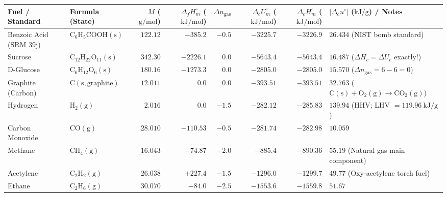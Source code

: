 \begin{center}
\label{tab:04:combustions}
\scriptsize\setlength{\tabcolsep}{3.2pt}\renewcommand{\arraystretch}{1.09}
\begin{tabularx}{\linewidth}{@{}l l r r r r r X@{}}\toprule
\textbf{Fuel / Standard} & \textbf{Formula (State)} & \textbf{$M$ ($\si{\gram\per\mole}$)} & \textbf{$\Delta_f H_m^\circ$ ($\si{\kilo\joule\per\mole}$)} & \textbf{$\Delta n_{\mathrm{gas}}$} & \textbf{$\Delta_c U_m^\circ$ ($\si{\kilo\joule\per\mole}$)} & \textbf{$\Delta_c H_m^\circ$ ($\si{\kilo\joule\per\mole}$)} & \textbf{$|\Delta_c u^\circ|$ ($\si{\kilo\joule\per\gram}$) / Notes} \\\midrule
Benzoic Acid (SRM 39j) & $\mathrm{C_6H_5COOH(s)}$ & $122.12$ & $-385.2$ & $-0.5$ & $\mathbf{-3225.7}$ & $-3226.9$ & $\mathbf{26.434}$ (NIST bomb standard) \\
Sucrose & $\mathrm{C_{12}H_{22}O_{11}(s)}$ & $342.30$ & $-2226.1$ & $0.0$ & $-5643.4$ & $-5643.4$ & $16.487$ ($\Delta H_c = \Delta U_c$ exactly!) \\
D-Glucose & $\mathrm{C_6H_{12}O_6(s)}$ & $180.16$ & $-1273.3$ & $0.0$ & $-2805.0$ & $-2805.0$ & $15.570$ ($\Delta n_{\mathrm{gas}} = 6 - 6 = 0$) \\
Graphite (Carbon) & $\mathrm{C(s,graphite)}$ & $12.011$ & $0.0$ & $0.0$ & $-393.51$ & $-393.51$ & $32.763$ ($\mathrm{C(s)+O_2(g)\to CO_2(g)}$) \\
Hydrogen & $\mathrm{H_2(g)}$ & $2.016$ & $0.0$ & $-1.5$ & $-282.12$ & $-285.83$ & $139.94$ (HHV; LHV $= \SI{119.96}{\kilo\joule\per\gram}$) \\
Carbon Monoxide & $\mathrm{CO(g)}$ & $28.010$ & $-110.53$ & $-0.5$ & $-281.74$ & $-282.98$ & $10.059$ \\
Methane & $\mathrm{CH_4(g)}$ & $16.043$ & $-74.87$ & $-2.0$ & $-885.4$ & $-890.36$ & $55.19$ (Natural gas main component) \\
Acetylene & $\mathrm{C_2H_2(g)}$ & $26.038$ & $+227.4$ & $-1.5$ & $-1296.0$ & $-1299.7$ & $49.77$ (Oxy-acetylene torch fuel) \\
Ethane & $\mathrm{C_2H_6(g)}$ & $30.070$ & $-84.0$ & $-2.5$ & $-1553.6$ & $-1559.8$ & $51.67$ \\

\end{tabularx}
\end{center}
